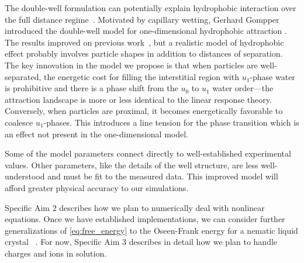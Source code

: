 The double-well formulation can potentially 
explain hydrophobic interaction over the full distance
regime~\cite{Lum1999, Lin2005, Meyer2006, Ducker2016}.
Motivated by capillary wetting, Gerhard
Gompper introduced the double-well model for one-dimensional
hydrophobic attraction \cite{GoHaKo94}.
The results improved on previous work~\cite{ErLjCl89,MaRa76},
but a realistic model of hydrophobic effect 
probably involves particle shapes in addition to distances of separation.
The key innovation in the model we propose is that when particles are
well-separated, the energetic cost for filling the interstitial region
with $u_1$-phase water is prohibitive and there is a phase shift from
the $u_0$ to $u_1$ water order---the attraction landscape is more or
less identical to the linear response theory. Conversely, when particles
are proximal, it becomes energetically favorable to coalesce
$u_1$-phases. This introduces a line tension for the phase transition
which is an effect not present in the one-dimensional model. 

Some of the model parameters connect directly
to well-established experimental values. Other
parameters, like the details of the well structure,
are less well-understood and must be fit to the measured data.
This improved model will afford greater physical accuracy to
our simulations.


Specific Aim 2 describes how we plan to numerically deal with nonlinear
equations. Once we have established implementations, 
we can consider further generalizations of 
\eqref{eq:free_energy} to the Oseen-Frank energy for a nematic liquid crystal
~\cite{doi:10.1137/15M103844X, Bartels,AIHPA_1997__66_4_411_0,
 deGennesProst,HaKiLi86,Virga}.  
For now, Specific Aim 3 describes in detail how we plan to handle
charges and ions in solution.



